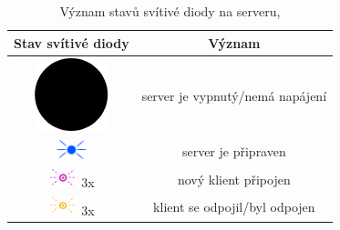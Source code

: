 \begin{table}[hbtp]
\centering
\newcommand{\LEDsingHeight}{0.55cm}
\caption{Význam stavů svítivé diody na serveru, }
\label{tab:serverLED}
\label{tab:LED_man}
\begin{tabular}{|c|c|}
\hline
\textbf{Stav svítivé diody}                                            & \textbf{Význam}                  \\ \hline
\includegraphics[height=\LEDsingHeight/2]{img/manual/black.png}             & server je vypnutý/nemá napájení  \\ \hline
\includegraphics[height=\LEDsingHeight]{img/manual/blue.png}              & server je připraven              \\ \hline
\includegraphics[height=\LEDsingHeight]{img/manual/violet_blink.png} 3x   & nový klient připojen             \\ \hline
\includegraphics[height=\LEDsingHeight]{img/manual/orange_blink.png}   3x & klient se odpojil/byl odpojen    \\ \hline

\end{tabular}
\end{table}
